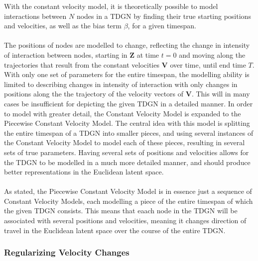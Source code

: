 With the constant velocity model, it is theoretically possible to model interactions between $N$ nodes in a TDGN by finding their true starting positions and velocities, as well as the bias term $\beta$, for a given timespan.
\\\\
The positions of nodes are modelled to change, reflecting the change in intensity of interaction between nodes, starting in $\textbf{Z}$ at time $t=0$ and moving along the trajectories that result from the constant velocities $\textbf{V}$ over time, until end time $T$.
With only one set of parameters for the entire timespan, the modelling ability is limited to describing changes in intensity of interaction with only changes in positions along the the trajectory of the velocity vectors of $\textbf{V}$.
This will in many cases be insufficient for depicting the given TDGN in a detailed manner. 
In order to model with greater detail, the Constant Velocity Model is expanded to the Piecewise Constant Velocity Model. 
The central idea with this model is splitting the entire timespan of a TDGN into smaller pieces, and using several instances of the Constant Velocity Model to model each of these pieces, resulting in several sets of true parameters.
Having several sets of positions and velocities allows for the TDGN to be modelled in a much more detailed manner, and should produce better representations in the Euclidean latent space.
\\\\
As stated, the Piecewise Constant Velocity Model is in essence just a sequence of Constant Velocity Models, each modelling a piece of the entire timespan of which the given TDGN consists. 
This means that eaach node in the TDGN will be associated with several positions and velocities, meaning it changes direction of travel in the Euclidean latent space over the course of the entire TDGN.



\subsubsection{Regularizing Velocity Changes}



